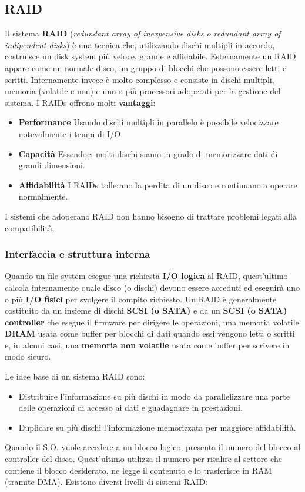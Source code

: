 \documentclass[12pt, letterpaper]{article}
\begin{document}
		\subsection{RAID}
			Il sistema \textbf{RAID} (\textit{redundant array of inexpensive disks o redundant array of indipendent disks}) è una tecnica che, utilizzando dischi multipli in accordo, costruisce un disk system più veloce, grande e affidabile. Esternamente un RAID appare come un normale disco, un gruppo di blocchi che possono essere letti e scritti. Internamente invece è molto complesso e consiste in dischi multipli, memoria (volatile e non) e uno o più processori adoperati per la gestione del sistema. I RAIDs offrono molti \textbf{vantaggi}:
			\begin{itemize}
				\item \textbf{Performance} Usando dischi multipli in parallelo è possibile velocizzare notevolmente i tempi di I/O.
				\item \textbf{Capacità} Essendoci molti dischi siamo in grado di memorizzare dati di grandi dimensioni. 
				\item \textbf{Affidabilità} I RAIDs tollerano la perdita di un disco e continuano a operare normalmente.
			\end{itemize}
			I sistemi che adoperano RAID non hanno bisogno di trattare problemi legati alla compatibilità.
			
			\subsubsection{Interfaccia e struttura interna}
				Quando un file system esegue una richiesta \textbf{I/O logica} al RAID, quest'ultimo calcola internamente quale disco (o dischi) devono essere acceduti ed eseguirà uno o più \textbf{I/O fisici} per svolgere il compito richiesto. Un RAID è generalmente costituito da un insieme di dischi \textbf{SCSI (o SATA)} e da un \textbf{SCSI (o SATA) controller}  che esegue il firmware per dirigere le operazioni, una memoria volatile \textbf{DRAM} usata come buffer per blocchi di dati quando essi vengono letti o scritti e, in alcuni casi, una \textbf{memoria non volatile} usata come buffer per scrivere in modo sicuro.
				
				Le idee base di un sistema RAID sono:
				\begin{itemize}
					\item Distribuire l'informazione su più dischi in modo da parallelizzare una parte delle operazioni di accesso ai dati e guadagnare in prestazioni.
					\item Duplicare su più dischi l'informazione memorizzata per maggiore affidabilità. 
				\end{itemize}
				Quando il S.O. vuole accedere a un blocco logico, presenta il numero del blocco al controller del disco. Quest'ultimo utilizza il numero per risalire al settore che contiene il blocco desiderato, ne legge il contenuto e lo trasferisce in RAM (tramite DMA). Esistono diversi livelli di sistemi RAID:
				
\end{document}
